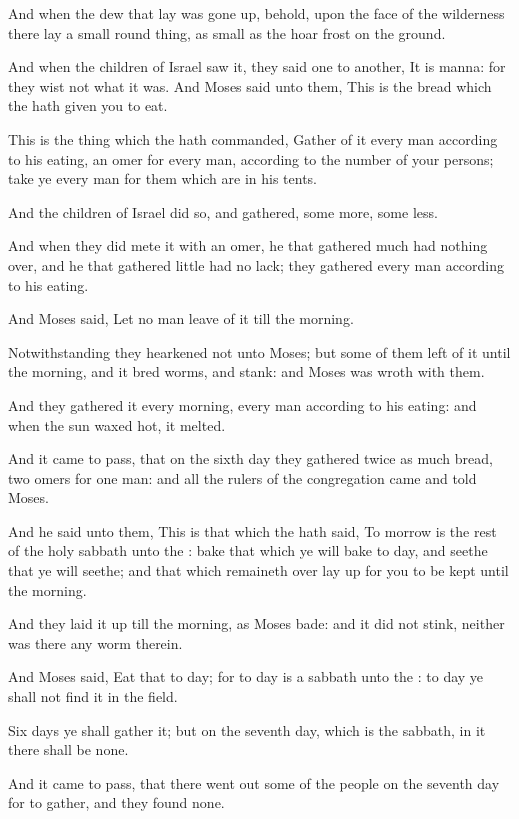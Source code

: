 \verse And when the dew that lay was gone up, behold, upon the face of
the wilderness there lay a small round thing, as small as the hoar
frost on the ground.

\verse And when the children of Israel saw it, they said one to
another, It is manna: for they wist not what it was. And Moses said
unto them, This is the bread which the \LORD hath given you to eat.

\verse This is the thing which the \LORD hath commanded, Gather of it
every man according to his eating, an omer for every man, according to
the number of your persons; take ye every man for them which are in
his tents.

\verse And the children of Israel did so, and gathered, some more, some
less.

\verse And when they did mete it with an omer, he that gathered much
had nothing over, and he that gathered little had no lack; they
gathered every man according to his eating.

\verse And Moses said, Let no man leave of it till the morning.

\verse Notwithstanding they hearkened not unto Moses; but some of them
left of it until the morning, and it bred worms, and stank: and Moses
was wroth with them.

\verse And they gathered it every morning, every man according to his
eating: and when the sun waxed hot, it melted.

\verse And it came to pass, that on the sixth day they gathered twice
as much bread, two omers for one man: and all the rulers of the
congregation came and told Moses.

\verse And he said unto them, This is that which the \LORD hath said, To
morrow is the rest of the holy sabbath unto the \LORD: bake that which
ye will bake to day, and seethe that ye will seethe; and that which
remaineth over lay up for you to be kept until the morning.

\verse And they laid it up till the morning, as Moses bade: and it did
not stink, neither was there any worm therein.

\verse And Moses said, Eat that to day; for to day is a sabbath unto
the \LORD: to day ye shall not find it in the field.

\verse Six days ye shall gather it; but on the seventh day, which is
the sabbath, in it there shall be none.

\verse And it came to pass, that there went out some of the people on
the seventh day for to gather, and they found none.

